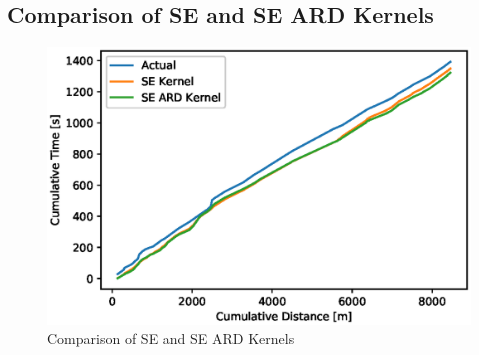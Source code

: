 \subsection{Comparison of SE and SE ARD Kernels} %

\label{appendix:kernel_compare} %


\begin{figure}
    \centering
    \includegraphics[width=\textwidth]{images/kernel_compare.eps}
    \caption{Comparison of SE and SE ARD Kernels}
    
\end{figure}